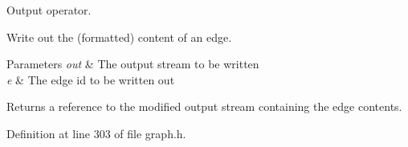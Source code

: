 Output operator. 

Write out the (formatted) content of an edge. 
\begin{DoxyParams}{Parameters}
{\em out} & The output stream to be written \\
\hline
{\em e} & The edge id to be written out \\
\hline
\end{DoxyParams}
\begin{DoxyReturn}{Returns}
a reference to the modified output stream containing the edge contents. 
\end{DoxyReturn}


Definition at line 303 of file graph.\+h.

